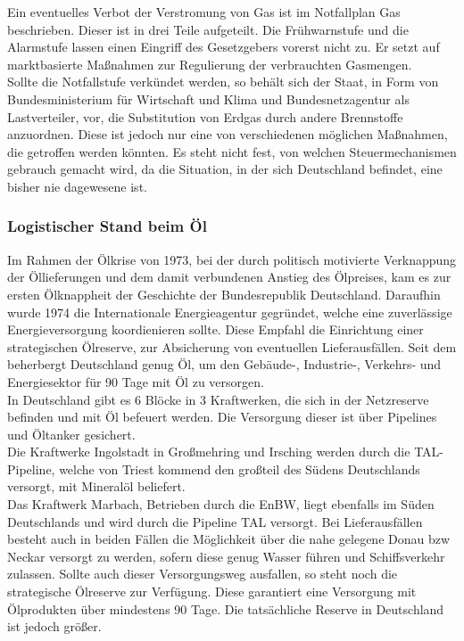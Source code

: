 	Ein eventuelles Verbot der Verstromung von Gas ist im Notfallplan Gas beschrieben. Dieser ist in drei Teile aufgeteilt. Die Frühwarnstufe und die Alarmstufe lassen einen Eingriff des Gesetzgebers vorerst nicht zu. Er setzt auf marktbasierte Maßnahmen zur Regulierung der verbrauchten Gasmengen. \\
	
	Sollte die Notfallstufe verkündet werden, so behält sich der Staat, in Form von Bundesministerium für Wirtschaft und Klima und Bundesnetzagentur als Lastverteiler, vor, die Substitution von Erdgas durch andere Brennstoffe anzuordnen. Diese ist jedoch nur eine von verschiedenen möglichen Maßnahmen, die getroffen werden könnten. Es steht nicht fest, von welchen Steuermechanismen gebrauch gemacht wird, da die Situation, in der sich Deutschland befindet, eine bisher nie dagewesene ist. \cite{Notfallplan_Gas}
	
	\subsubsection{Logistischer Stand beim Öl}
	Im Rahmen der Ölkrise von 1973, bei der durch politisch motivierte Verknappung der Öllieferungen und dem damit verbundenen Anstieg des Ölpreises, kam es zur ersten Ölknappheit der Geschichte der Bundesrepublik Deutschland. Daraufhin wurde 1974 die Internationale Energieagentur gegründet, welche eine zuverlässige Energieversorgung koordienieren sollte. Diese Empfahl die Einrichtung einer strategischen Ölreserve, zur Absicherung von eventuellen Lieferausfällen. Seit dem beherbergt Deutschland genug Öl, um den Gebäude-, Industrie-, Verkehrs- und Energiesektor für 90 Tage mit Öl zu versorgen.\cite{strat_Ölreserve_Geschichte}\\
	
	In Deutschland gibt es 6 Blöcke in 3 Kraftwerken, die sich in der Netzreserve befinden und mit Öl befeuert werden.\cite{Excel_Kraftwerksliste} Die Versorgung dieser ist über Pipelines und Öltanker gesichert.\\
	Die Kraftwerke Ingolstadt in Großmehring und Irsching werden durch die TAL-Pipeline, welche von Triest kommend den großteil des Südens Deutschlands versorgt, mit Mineralöl beliefert.\\
	Das Kraftwerk Marbach, Betrieben durch die EnBW, liegt ebenfalls im Süden Deutschlands und wird durch die Pipeline TAL versorgt. Bei Lieferausfällen besteht auch in beiden Fällen die Möglichkeit über die nahe gelegene Donau bzw Neckar versorgt zu werden, sofern diese genug Wasser führen und Schiffsverkehr zulassen. Sollte auch dieser Versorgungsweg ausfallen, so steht noch die strategische Ölreserve zur Verfügung. Diese garantiert eine Versorgung mit Ölprodukten über mindestens 90 Tage. Die tatsächliche Reserve in Deutschland ist jedoch größer.\\
	
